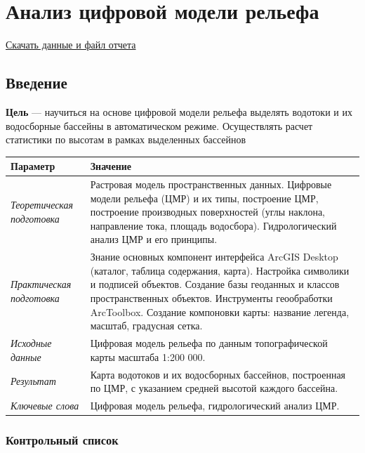 \documentclass[]{book}
\theoremstyle{definition}
\theoremstyle{definition}
\theoremstyle{definition}
\theoremstyle{remark}
\begin{document}
\hypertarget{dem}{%
\chapter{Анализ цифровой модели рельефа}\label{dem}}

\href{http://autolab.geogr.msu.ru/gis/data/Ex15.zip}{Скачать данные и
файл отчета}

\hypertarget{dem-intro}{%
\section{Введение}\label{dem-intro}}

\textbf{Цель} --- научиться на основе цифровой модели рельефа выделять
водотоки и их водосборные бассейны в автоматическом режиме. Осуществлять
расчет статистики по высотам в рамках выделенных бассейнов

\begin{longtable}[]{@{}ll@{}}
\toprule
Параметр & Значение\tabularnewline
\midrule
\endhead
\emph{Теоретическая подготовка} & Растровая модель пространственных
данных. Цифровые модели рельефа (ЦМР) и их типы, построение ЦМР,
построение производных поверхностей (углы наклона, направление тока,
площадь водосбора). Гидрологический анализ ЦМР и его
принципы.\tabularnewline
\emph{Практическая подготовка} & Знание основных компонент интерфейса
ArcGIS Desktop (каталог, таблица содержания, карта). Настройка символики
и подписей объектов. Создание базы геоданных и классов пространственных
объектов. Инструменты геообработки ArcToolbox. Создание компоновки
карты: название легенда, масштаб, градусная сетка.\tabularnewline
\emph{Исходные данные} & Цифровая модель рельефа по данным
топографической карты масштаба 1:200 000.\tabularnewline
\emph{Результат} & Карта водотоков и их водосборных бассейнов,
построенная по ЦМР, с указанием средней высотой каждого
бассейна.\tabularnewline
\emph{Ключевые слова} & Цифровая модель рельефа, гидрологический анализ
ЦМР.\tabularnewline
\bottomrule
\end{longtable}

\hypertarget{dem-control}{%
\subsection{Контрольный список}\label{dem-control}}
\end{document}
